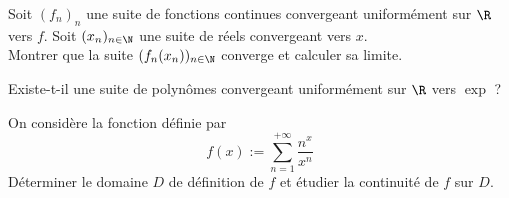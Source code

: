 \begin{exo}
	\label{seriesfonc1}
	Soit $(f_n)_n$ une suite de fonctions continues convergeant uniformément 
	sur $\R$ vers $f$. 
	Soit $(x_n)_{n\in\N}$ une suite de réels convergeant vers $x$.\\
	Montrer que la suite $(f_n(x_n))_{n\in\N}$ converge et calculer sa limite.
\end{exo}

\begin{exo}
	\label{seriesfonc2}
	Existe-t-il une suite de polynômes convergeant uniformément sur $\R$ vers $\exp$ ?
\end{exo}

\begin{exo}
    \label{seriesfonc3}
    On considère la fonction définie par 
    \[f(x):=\sum_{n=1}^{+\infty}\frac{n^x}{x^n}\]
    Déterminer le domaine $D$ de définition de $f$ et étudier la continuité de $f$ sur $D$.
\end{exo}